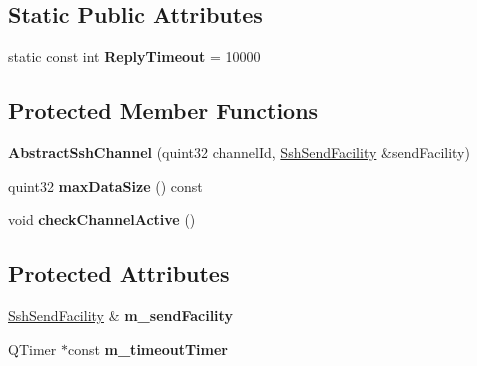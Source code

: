 \subsection*{Static Public Attributes}
\begin{DoxyCompactItemize}
\item 
\mbox{\label{class_q_ssh_1_1_internal_1_1_abstract_ssh_channel_a6bc4596fe3806e0dca452aaa461b3759}} 
static const int {\bfseries Reply\+Timeout} = 10000
\end{DoxyCompactItemize}
\subsection*{Protected Member Functions}
\begin{DoxyCompactItemize}
\item 
\mbox{\label{class_q_ssh_1_1_internal_1_1_abstract_ssh_channel_ae2d874a2c184db27cde38ed32c458b29}} 
{\bfseries Abstract\+Ssh\+Channel} (quint32 channel\+Id, \mbox{\hyperlink{class_q_ssh_1_1_internal_1_1_ssh_send_facility}{Ssh\+Send\+Facility}} \&send\+Facility)
\item 
\mbox{\label{class_q_ssh_1_1_internal_1_1_abstract_ssh_channel_a82b8c5b77cc76cc0a818cd2d9c3d5d6f}} 
quint32 {\bfseries max\+Data\+Size} () const
\item 
\mbox{\label{class_q_ssh_1_1_internal_1_1_abstract_ssh_channel_a6990e67dc0694bb5cd971c25c60f7e00}} 
void {\bfseries check\+Channel\+Active} ()
\end{DoxyCompactItemize}
\subsection*{Protected Attributes}
\begin{DoxyCompactItemize}
\item 
\mbox{\label{class_q_ssh_1_1_internal_1_1_abstract_ssh_channel_a4b62076fddf24ab0bd1d4effd29fc101}} 
\mbox{\hyperlink{class_q_ssh_1_1_internal_1_1_ssh_send_facility}{Ssh\+Send\+Facility}} \& {\bfseries m\+\_\+send\+Facility}
\item 
\mbox{\label{class_q_ssh_1_1_internal_1_1_abstract_ssh_channel_a8d415e2225558f2397c6d43439aa7d58}} 
Q\+Timer $\ast$const {\bfseries m\+\_\+timeout\+Timer}
\end{DoxyCompactItemize}


